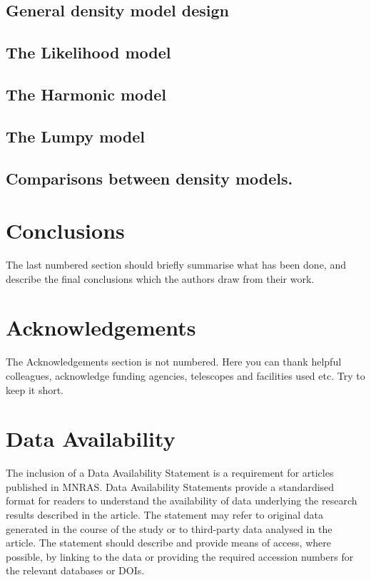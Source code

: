 \documentclass[fleqn,usenatbib]{mnras}
\begin{document}
\subsection{General density model design}




\subsection{The Likelihood model}




\subsection{The Harmonic model}




\subsection{The Lumpy model}




\subsection{Comparisons between density models.}




\section{Conclusions}

The last numbered section should briefly summarise what has been done, and describe
the final conclusions which the authors draw from their work.

\section*{Acknowledgements}

The Acknowledgements section is not numbered. Here you can thank helpful
colleagues, acknowledge funding agencies, telescopes and facilities used etc.
Try to keep it short.

\section*{Data Availability}

 
The inclusion of a Data Availability Statement is a requirement for articles published in MNRAS. Data Availability Statements provide a standardised format for readers to understand the availability of data underlying the research results described in the article. The statement may refer to original data generated in the course of the study or to third-party data analysed in the article. The statement should describe and provide means of access, where possible, by linking to the data or providing the required accession numbers for the relevant databases or DOIs.
\end{document}

